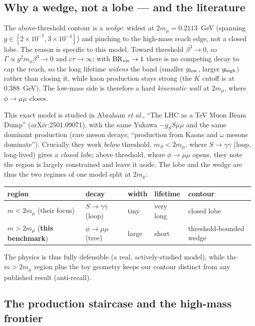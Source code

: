 \documentclass[11pt]{article}
\newcommand{\mphi}{m_\phi}
\begin{document}
\subsection{Why a wedge, not a lobe --- and the literature}
\label{sec:results:wedge}

The above-threshold contour is a \emph{wedge}: widest at $2m_\mu=0.2113$~GeV
(spanning $g\in[2\times10^{-7},3\times10^{-4}]$) and pinching to the high-mass
reach edge, not a closed lobe. The reason is specific to this model. Toward
threshold $\beta^3\to0$, so $\Gamma\propto g^2\mphi\beta^3\to0$ and
$c\tau\to\infty$; with $\mathrm{BR}_{\rm vis}\to1$ there is no competing decay to
cap the reach, so the long lifetime \emph{widens} the band (smaller
$g_{\rm low}$, larger $g_{\rm high}$) rather than closing it, while kaon
production stays strong (the $K$ cutoff is at $0.388$~GeV). The low-mass side is
therefore a hard \emph{kinematic wall} at $2m_\mu$, where $\phi\to\mu\mu$ closes.

This exact model is studied in Abraham \emph{et al.}, ``The LHC as a TeV Muon
Beam Dump'' (arXiv:2501.09071), with the same Yukawa $-g_S S\bar\mu\mu$ and the
same dominant production (rare meson decays; ``production from Kaons and $\omega$
mesons dominate''). Crucially they work \emph{below} threshold, $m_S<2m_\mu$,
where $S\to\gamma\gamma$ (loop, long-lived) gives a \emph{closed lobe}; above
threshold, where $\phi\to\mu\mu$ opens, they note the region is largely
constrained and leave it aside. The lobe and the wedge are thus the two regimes
of one model split at $2m_\mu$:
\begin{center}\footnotesize
\begin{tabular}{lllll}
\toprule
region & decay & width & lifetime & contour \\
\midrule
$m<2m_\mu$ (their focus) & $S\to\gamma\gamma$ (loop) & tiny & very long & closed lobe \\
$m>2m_\mu$ (\textbf{this benchmark}) & $\phi\to\mu\mu$ (tree) & large & short & threshold-bounded wedge \\
\bottomrule
\end{tabular}
\end{center}
The physics is thus fully defensible (a real, actively-studied model), while the
$m>2m_\mu$ region plus the toy geometry keeps our contour distinct from any
published result (anti-recall).

\subsection{The production staircase and the high-mass frontier}
\label{sec:results:staircase}
\end{document}
